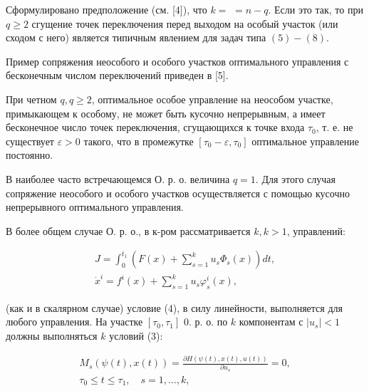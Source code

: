 \documentclass[10pt]{article}
\begin{document}
Сформулировано предположение (см. [4]), что $k=$ $=n-q$. Если это так, то при $q \geqslant 2$ сгущение точек переключения перед выходом на особый участок (или сходом с него) является типичным явлением для задач типа $(5)-(8)$.



Пример сопряжения неособого и особого участков оптимального управления с бесконечным числом переключений приведен в [5].



При четном $q, q \geqslant 2$, оптимальное особое управление на неособом участке, примыкающем к особому, не может быть кусочно непрерывным, а имеет бесконечное число точек переключения, сгущающихся к точке входа $\tau_{0}$, т. е. не существует $\varepsilon>0$ такого, что в промежутке $\left[\tau_{0}-\varepsilon, \tau_{0}\right]$ оптимальное управление постоянно.



В наиболее часто встречающемся О. р. о. величина $q=1$. Для этого случая сопряжение неособого и особого участков осуществляется с помощью кусочно непрерывного оптимального управления.



В более общем случае О. р. о., в к-ром рассматривается $k, k>1$, управлений:



\[

\begin{gathered}

J=\int_{0}^{t_{1}}\left(F(x)+\sum_{s=1}^{k} u_{s} \Phi_{s}(x)\right) d t, \\

\dot{x}^{i}=f^{i}(x)+\sum_{s=1}^{k} u_{s} \varphi_{s}^{i}(x),

\end{gathered}

\]



(как и в скалярном случае) условие (4), в силу линейности, выполняется для любого управления. На участке $\left[\tau_{0}, \tau_{1}\right]$ 0. р. о. по $k$ компонентам с $\left|u_{s}\right|<1$ должны выполняться $k$ условий (3):



\[

\begin{gathered}

M_{s}(\psi(t), x(t))=\frac{\partial H(\psi(t), x(t), u(t))}{\partial u_{s}}=0, \\

\tau_{0} \leqslant t \leqslant \tau_{1}, \quad s=1, \ldots, k,

\end{gathered}

\]
\end{document}
